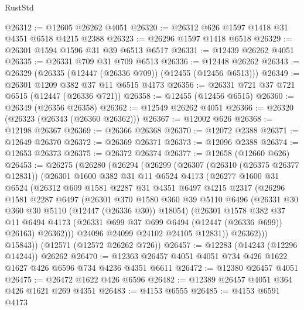 \begin{lexlean}{RustStd}
\begin{coremodule}
@26312 := @12605 @26262 @4051
@26320 := @26312 @626 @1597 @1418 @31 @4351 @6518 @4215 @2388
@26323 := @26296 @1597 @1418 @6518
@26329 := @26301 @1594 @1596 @31 @39 @6513 @6517
@26331 := @12439 @26262 @4051
@26335 := @26331 @709 @31 @709 @6513
@26336 := @12448 @26262
@26343 := @26329 (@26335 (@12447 (@26336 @709)) (@12455 (@12456 @6513)))
@26349 := @26301 @1209 @382 @37 @11 @6515 @4173
@26356 := @26331 @721 @37 @721 @6515 (@12447 (@26336 @721))
@26358 := @12455 (@12456 @6515)
@26360 := @26349 (@26356 @26358)
@26362 := @12549 @26262 @4051
@26366 := @26320 (@26323 (@26343 (@26360 @26362)))
@26367 := @12002 @626
@26368 := @12198 @26367
@26369 := @26366 @26368
@26370 := @12072 @2388
@26371 := @12649 @26370
@26372 := @26369 @26371
@26373 := @12096 @2388
@26374 := @12653 @26373
@26375 := @26372 @26374
@26377 := @12658 (@12660 @626)
@26453 := @26275
    (@26280
      (@26294
        (@26299
          (@26307
            (@26310 (@26375 @26377 @12831))
            (@26301
              @1600
              @382
              @31
              @11
              @6524
              @4173
              (@26277
                @1600
                @31
                @6524
                (@26312
                  @609
                  @1581
                  @2287
                  @31
                  @4351
                  @6497
                  @4215
                  @2317
                  (@26296
                    @1581
                    @2287
                    @6497
                    (@26301
                      @370
                      @1580
                      @360
                      @39
                      @5110
                      @6496
                      (@26331 @30 @360 @30 @5110 (@12447 (@26336 @30)) @18054)
                      (@26301
                        @1578
                        @382
                        @37
                        @11
                        @6494
                        @4173
                        (@26331 @699 @37 @699 @6494 (@12447 (@26336 @699)) @26163)
                        @26362)))
                  @24096
                  @24099
                  @24102
                  @24105
                  @12831))
              @26362)))
        @15843))
    (@12571 (@12572 @26262 @726))
@26457 := @12283 (@14243 (@12296 @14244)) @26262
@26470 := @12363 @26457 @4051 @4051 @734 @426 @1622 @1627 @426 @6596 @734 @4236 @4351 @6611
@26472 := @12380 @26457 @4051
@26475 := @26472 @1622 @426 @6596
@26482 := @12389 @26457 @4051 @364 @426 @1621 @269 @4351
@26483 := @4153 @6555
@26485 := @4153 @6591 @4173

\end{coremodule}
\end{lexlean}
